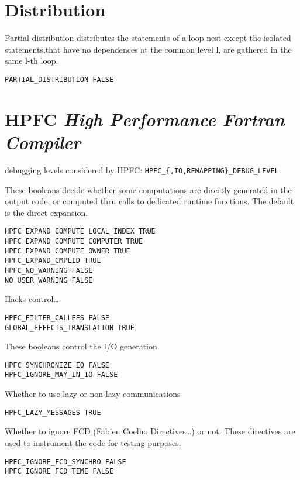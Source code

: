 \section{Distribution}

Partial distribution distributes the statements of a loop nest except
 the isolated statements,that have no dependences at the common level l,
 are gathered in the same l-th loop.

\begin{verbatim}
PARTIAL_DISTRIBUTION FALSE
\end{verbatim}

\section{HPFC {\em High Performance Fortran Compiler}}

debugging levels considered by HPFC: 
{\tt HPFC\_\{,IO,REMAPPING\}\_DEBUG\_LEVEL}.

  These booleans decide whether some computations are directly
generated in the output code, or computed thru calls to dedicated
runtime functions. The default is the direct expansion.

\begin{verbatim}
HPFC_EXPAND_COMPUTE_LOCAL_INDEX TRUE
HPFC_EXPAND_COMPUTE_COMPUTER TRUE
HPFC_EXPAND_COMPUTE_OWNER TRUE
HPFC_EXPAND_CMPLID TRUE
HPFC_NO_WARNING FALSE
NO_USER_WARNING FALSE
\end{verbatim}

   Hacks control\ldots

\begin{verbatim}
HPFC_FILTER_CALLEES FALSE
GLOBAL_EFFECTS_TRANSLATION TRUE
\end{verbatim}

  These booleans control the I/O generation.

\begin{verbatim}
HPFC_SYNCHRONIZE_IO FALSE
HPFC_IGNORE_MAY_IN_IO FALSE
\end{verbatim}

  Whether to use lazy or non-lazy communications

\begin{verbatim}
HPFC_LAZY_MESSAGES TRUE
\end{verbatim}

Whether to ignore FCD (Fabien Coelho Directives\ldots) or not. These
directives are used to instrument the code for testing purposes.

\begin{verbatim}
HPFC_IGNORE_FCD_SYNCHRO FALSE
HPFC_IGNORE_FCD_TIME FALSE
\end{verbatim}




